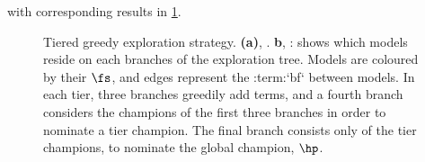 with corresponding results in \cref{fig:example_es_tiered_greedy}. 
\begin{figure}[H]
    \begin{center}
    \qquad
    \end{center}
    \caption[Tiered greedy exploration strategy]{
        Tiered greedy exploration strategy. 
        \textbf{(a)}, . 
        \textbf{b}, : shows which models reside on each branches of the exploration tree. 
        Models are coloured by their $\fs$, and edges represent the :term:`bf` between models. 
        In each tier, three branches greedily add terms, and a fourth branch considers the champions of the first three branches
        in order to nominate a tier champion. 
        The final branch consists only of the tier champions, to nominate the global champion, $\hp$.  
    }
    \label{fig:example_es_tiered_greedy}
\end{figure}

